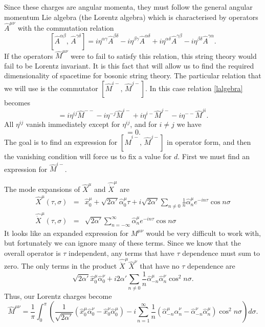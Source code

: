 \documentclass[a4paper,12pt]{article}
\numberwithin{equation}{section}
\begin{document}
Since these charges are angular momenta, they must follow the general angular momentum Lie algebra (the Lorentz algebra) which is characterised by operators $\hat{A}^{\mu\nu}$ with the commutation relation
\begin{equation}\label{lalgebra}
[\hat{A}^{\alpha\beta},\,\hat{A}^{\gamma\delta}] = i\eta^{\alpha\gamma}\hat{A}^{\beta\delta}-i\eta^{\beta\gamma}\hat{A}^{\alpha\delta} + i\eta^{\alpha\delta}\hat{A}^{\gamma\beta}-i\eta^{\beta\delta}\hat{A}^{\gamma\alpha}.
\end{equation}
If the operators $\hat{M}^{\mu\nu}$ were to fail to satisfy this relation, this string theory would fail to be Lorentz invariant. It is this fact that will allow us to find the required dimensionality of spacetime for bosonic string theory. The particular relation that we will use is the commutator $[\hat{M}^{i-},\,\hat{M}^{j-}]$. In this case relation \ref{lalgebra} becomes
\begin{equation}
[\hat{M}^{i-},\,\hat{M}^{j-}] = i\eta^{ij}\hat{M}^{--}-i\eta^{-j}\hat{M}^{i-} + i\eta^{i-}\hat{M}^{j-}-i\eta^{--}\hat{M}^{ji}.
\end{equation}
All $\eta^{ij}$ vanish immediately except for $\eta^{ij}$, and for $i\ne j$ we have
\begin{equation}
[\hat{M}^{i-},\,\hat{M}^{j-}] = 0.
\end{equation}
The goal is to find an expression for $[\hat{M}^{i-},\,\hat{M}^{j-}]$ in operator form, and then the vanishing condition will force us to fix a value for $d$. First we must find an expression for $\hat{M}^{i-}$.

The mode expansions of $\hat{X}^\mu$ and $\hat{\dot{X}}^\mu$ are
\begin{eqnarray}
\hat{X}^\mu(\tau,\sigma) &=& \hat{x}_0^\mu + \sqrt{2\alpha'}\hat{\alpha}_0^\mu\tau+i\sqrt{2\alpha'}\sum_{n \ne 0}\frac{1}{n}\hat{\alpha}_n^\mu e^{-in\tau}\cos n\sigma\\
\hat{\dot{X}}^\mu(\tau,\sigma) &=& \sqrt{2\alpha'}\sum_{n =-\infty}^\infty\hat{\alpha}_n^\mu e^{-in\tau} \cos n\sigma
\end{eqnarray}
It looks like an expanded expression for $M^{\mu\nu}$ would be very difficult to work with, but fortunately we can ignore many of these terms. Since we know that the overall operator is $\tau$ independent, any terms that have $\tau$ dependence must sum to zero. The only terms in the product $\hat{\dot{X}}^\mu\hat{X}^\nu$ that have no $\tau$ dependence are 
\begin{equation}
\sqrt{2\alpha'}\hat{x}_0^\mu\hat{\alpha}_0^\nu + i2\alpha'\sum_{n \ne 0}\frac{1}{n}\hat{\alpha}_{-n}^\mu\hat{\alpha}_{n}^\nu\cos^2n\sigma. 
\end{equation}
Thus, our Lorentz charges become 
\begin{equation}
\hat{M}^{\mu\nu} = \frac{1}{\pi}\int_0^\pi\left(\frac{1}{\sqrt{2\alpha'}}\left(\hat{x}_0^\mu\hat{\alpha}_0^\nu-\hat{x}_0^\nu\hat{\alpha}_0^\mu\right) -i\sum_{n=1}^\infty\frac{1}{n}\left(\hat{\alpha}_{-n}^\mu\hat{\alpha}_n^\nu-\hat{\alpha}_{-n}^\nu\hat{\alpha}_{n}^\mu\right)\cos^2n\sigma\right)d\sigma.
\end{equation}
\end{document}
